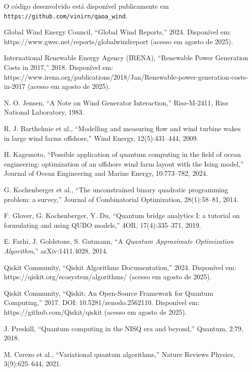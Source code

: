 \documentclass{weciq}
\begin{document}
O código desenvolvido está disponível publicamente em \texttt{https://github.com/vinirn/qaoa\_wind}.


\begin{thebibliography}{99}
Global Wind Energy Council, ``Global Wind Reports,'' 2024. Disponível em: https://www.gwec.net/reports/globalwindreport (acesso em agosto de 2025).

International Renewable Energy Agency (IRENA), ``Renewable Power Generation Costs in 2017,'' 2018. Disponível em: https://www.irena.org/publications/2018/Jan/Renewable-power-generation-costs-in-2017 (acesso em agosto de 2025).

N. O. Jensen, ``A Note on Wind Generator Interaction,'' Risø-M-2411, Risø National Laboratory, 1983.

R. J. Barthelmie et al., ``Modelling and measuring flow and wind turbine wakes in large wind farms offshore,'' Wind Energy, 12(5):431--444, 2009.

H. Kagemoto, ``Possible application of quantum computing in the field of ocean engineering: optimization of an offshore wind farm layout with the Ising model,'' Journal of Ocean Engineering and Marine Energy, 10:773--782, 2024.

G. Kochenberger et al., ``The unconstrained binary quadratic programming problem: a survey,'' Journal of Combinatorial Optimization, 28(1):58--81, 2014.

F. Glover, G. Kochenberger, Y. Du, ``Quantum bridge analytics I: a tutorial on formulating and using QUBO models,'' 4OR, 17(4):335--371, 2019.

E. Farhi, J. Goldstone, S. Gutmann, ``A \textit{Quantum Approximate Optimization Algorithm},'' arXiv:1411.4028, 2014.

Qiskit Community, ``Qiskit Algorithms Documentation,'' 2024. Disponível em: https://qiskit.org/ecosystem/algorithms/ (acesso em agosto de 2025).

Qiskit Community, ``Qiskit: An Open-Source Framework for Quantum Computing,'' 2017. DOI: 10.5281/zenodo.2562110. Disponível em: https://github.com/Qiskit/qiskit (acesso em agosto de 2025).

J. Preskill, ``Quantum computing in the NISQ era and beyond,'' Quantum, 2:79, 2018.

M. Cerezo et al., ``Variational quantum algorithms,'' Nature Reviews Physics, 3(9):625--644, 2021.
\end{thebibliography}
\end{document}
